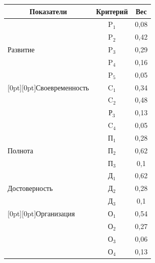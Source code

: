 \begin{table}
\begin{center}
\begin{tabular}{|l|c|c|}
\hline

\multicolumn{1}{|c|}{Показатели} &Критерий &Вес\\

\hline

 & P$_1$ & 0,08\\

& P$_2$ & 0,42\\

Развитие& P$_3$ & 0,29\\

& P$_4$ & 0,16\\

& P$_5$ & 0,05\\

\hline

\multicolumn{1}{|l|}{\raisebox{-16pt}[0pt][0pt]{Своевременность}}&C$_1$& 0,34\\

&C$_2$&0,48\\

&Р$_3$&0,13\\

&C$_4$&0,05\\

\hline

& П$_1$ & 0,28\\

Полнота& П$_2$ & 0,62\\

& П$_3$ & 0,1\hphantom{9}\\

\hline

 & Д$_1$ & 0,62\\

Достоверность& Д$_2$ & 0,28\\

& Д$_3$ & 0,1\hphantom{9}\\

\hline

\multicolumn{1}{|l|}{\raisebox{-16pt}[0pt][0pt]{Организация}} & О$_1$ & 0,54\\

& О$_2$ & 0,27\\

& О$_3$ & 0,06\\

& О$_4$ & 0,13\\

\hline

\end{tabular}

\end{center}


\end{table}
